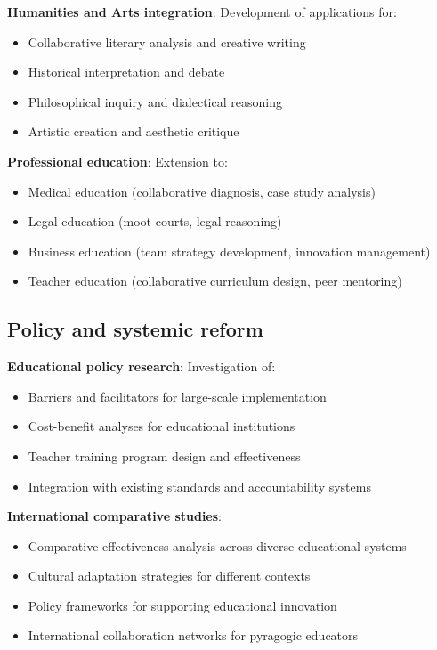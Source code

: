 \textbf{Humanities and Arts integration}:
Development of applications for:
\begin{itemize}
	\item Collaborative literary analysis and creative writing
	\item Historical interpretation and debate
	\item Philosophical inquiry and dialectical reasoning
	\item Artistic creation and aesthetic critique
\end{itemize}

\textbf{Professional education}:
Extension to:
\begin{itemize}
	\item Medical education (collaborative diagnosis, case study analysis)
	\item Legal education (moot courts, legal reasoning)
	\item Business education (team strategy development, innovation management)
	\item Teacher education (collaborative curriculum design, peer mentoring)
\end{itemize}

\newpage

\subsection{Policy and systemic reform}

\textbf{Educational policy research}:
Investigation of:
\begin{itemize}
	\item Barriers and facilitators for large-scale implementation
	\item Cost-benefit analyses for educational institutions
	\item Teacher training program design and effectiveness
	\item Integration with existing standards and accountability systems
\end{itemize}

\textbf{International comparative studies}:
\begin{itemize}
	\item Comparative effectiveness analysis across diverse educational systems
	\item Cultural adaptation strategies for different contexts
	\item Policy frameworks for supporting educational innovation
	\item International collaboration networks for pyragogic educators
\end{itemize}

